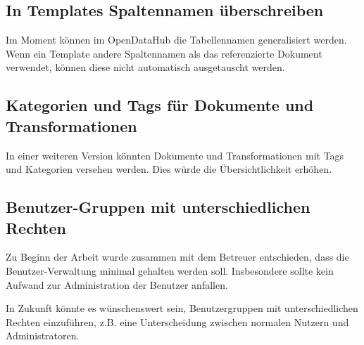 \subsection{In Templates Spaltennamen überschreiben}
Im Moment können im OpenDataHub die Tabellennamen generalisiert werden. Wenn ein Template andere Spaltennamen als das referenzierte Dokument verwendet, können diese nicht automatisch ausgetauscht werden.

\subsection{Kategorien und Tags für Dokumente und Transformationen}
In einer weiteren Version könnten Dokumente und Transformationen mit Tags und Kategorien versehen werden. Dies würde die Übersichtlichkeit erhöhen.

\subsection{Benutzer-Gruppen mit unterschiedlichen Rechten}
Zu Beginn der Arbeit wurde zusammen mit dem Betreuer entschieden, dass die Benutzer-Verwaltung minimal gehalten werden soll. Insbesondere sollte kein Aufwand zur Administration der Benutzer anfallen.

In Zukunft könnte es wünschenswert sein, Benutzergruppen mit unterschiedlichen Rechten einzuführen, z.B. eine Unterscheidung zwischen normalen Nutzern und Administratoren.